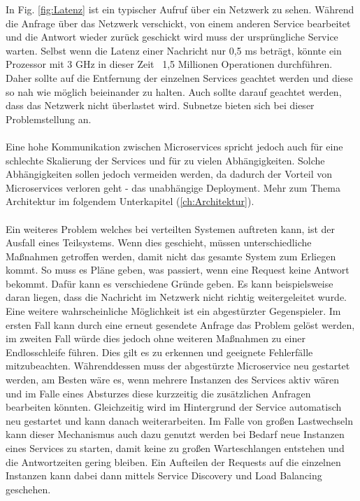 In Fig. \ref{fig:Latenz} ist ein typischer Aufruf über ein Netzwerk zu sehen. Während die Anfrage über das Netzwerk verschickt, von einem anderen Service bearbeitet und die Antwort wieder zurück geschickt wird muss der ursprüngliche Service warten. Selbst wenn die Latenz einer Nachricht nur 0,5 ms beträgt, könnte ein Prozessor mit 3 GHz in dieser Zeit ~1,5 Millionen Operationen durchführen. Daher sollte auf die Entfernung der einzelnen Services geachtet werden und diese so nah wie möglich beieinander zu halten. Auch sollte darauf geachtet werden, dass das Netzwerk nicht überlastet wird. Subnetze bieten sich bei dieser Problemstellung an. \paragraph{}
Eine hohe Kommunikation zwischen Microservices spricht jedoch auch für eine schlechte Skalierung der Services und für zu vielen Abhängigkeiten. Solche Abhängigkeiten sollen jedoch vermeiden werden, da dadurch der Vorteil von Microservices verloren geht - das unabhängige Deployment. Mehr zum Thema Architektur im folgendem Unterkapitel (\ref{ch:Architektur}). \paragraph{}
Ein weiteres Problem welches bei verteilten Systemen auftreten kann, ist der Ausfall eines Teilsystems. Wenn dies geschieht, müssen unterschiedliche Maßnahmen getroffen werden, damit nicht das gesamte System zum Erliegen kommt. So muss es Pläne geben, was passiert, wenn eine Request keine Antwort bekommt. Dafür kann es verschiedene Gründe geben. Es kann beispielsweise daran liegen, dass die Nachricht im Netzwerk nicht richtig weitergeleitet wurde. Eine weitere wahrscheinliche Möglichkeit ist ein abgestürzter Gegenspieler. Im ersten Fall kann durch eine erneut gesendete Anfrage das Problem gelöst werden, im zweiten Fall würde dies jedoch ohne weiteren Maßnahmen zu einer Endlosschleife führen. Dies gilt es zu erkennen und geeignete Fehlerfälle mitzubeachten. \newline
Währenddessen muss der abgestürzte Microservice neu gestartet werden, am Besten wäre es, wenn mehrere Instanzen des Services aktiv wären und im Falle eines Absturzes diese kurzzeitig die zusätzlichen Anfragen bearbeiten könnten. Gleichzeitig wird im Hintergrund der Service automatisch neu gestartet und kann danach weiterarbeiten. \newline
Im Falle von großen Lastwechseln kann dieser Mechanismus auch dazu genutzt werden bei Bedarf neue Instanzen eines Services zu starten, damit keine zu großen Warteschlangen entstehen und die Antwortzeiten gering bleiben. Ein Aufteilen der Requests auf die einzelnen Instanzen kann dabei dann mittels Service Discovery und Load Balancing geschehen. \cite{microservices}

